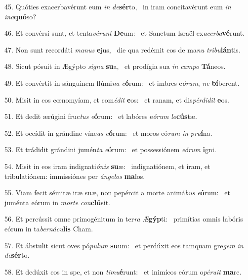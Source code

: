 45. Quóties exacerbavérunt eum \textit{in} \textit{de}\textbf{sér}to, \ast\  in iram concitavérunt eum \textit{in} \textit{in}\textit{a}\textbf{quó}so?\

46. Et convérsi sunt, et tenta\textit{vé}\textit{runt} \textbf{De}um: \ast\  et Sanctum Israël ex\textit{a}\textit{cer}\textit{ba}\textbf{vé}runt.\

47. Non sunt recordáti \textit{ma}\textit{nus} \textbf{e}jus, \ast\  die qua redémit eos de ma\textit{nu} \textit{tri}\textit{bu}\textbf{lán}tis.\

48. Sicut pósuit in Ægýpto \textit{si}\textit{gna} \textbf{su}a, \ast\  et prodígia sua \textit{in} \textit{cam}\textit{po} \textbf{Tá}neos.\

49. Et convértit in sánguinem flúmi\textit{na} \textit{e}\textbf{ó}rum: \ast\  et imbres e\textit{ó}\textit{rum}, \textit{ne} \textbf{bí}berent.\

50. Misit in eos cœnomyíam, et com\textit{é}\textit{dit} \textbf{e}os: \ast\  et ranam, et dis\textit{pér}\textit{di}\textit{dit} \textbf{e}os.\

51. Et dedit ærúgini fruc\textit{tus} \textit{e}\textbf{ó}rum: \ast\  et labóres e\textit{ó}\textit{rum} \textit{lo}\textbf{cús}tæ.\

52. Et occídit in grándine víne\textit{as} \textit{e}\textbf{ó}rum: \ast\  et moros eó\textit{rum} \textit{in} \textit{pru}\textbf{í}na.\

53. Et trádidit grándini jumén\textit{ta} \textit{e}\textbf{ó}rum: \ast\  et possessiónem \textit{e}\textit{ó}\textit{rum} \textbf{i}gni.\

54. Misit in eos iram indignati\textit{ó}\textit{nis} \textbf{su}æ: \ast\  indignatiónem, et iram, et tribulatiónem: immissiónes per \textit{án}\textit{ge}\textit{los} \textbf{ma}los.\

55. Viam fecit sémitæ iræ suæ, non pepércit a morte animá\textit{bus} \textit{e}\textbf{ó}rum: \ast\  et juménta eórum in \textit{mor}\textit{te} \textit{con}\textbf{clú}sit.\

56. Et percússit omne primogénitum in ter\textit{ra} \textit{Æ}\textbf{gýp}ti: \ast\  primítias omnis labóris eórum in ta\textit{ber}\textit{ná}\textit{cu}\textbf{lis} Cham.\

57. Et ábstulit sicut oves pó\textit{pu}\textit{lum} \textbf{su}um: \ast\  et perdúxit eos tamquam gre\textit{gem} \textit{in} \textit{de}\textbf{sér}to.\

58. Et dedúxit eos in spe, et non \textit{ti}\textit{mu}\textbf{é}runt: \ast\  et inimícos eórum o\textit{pé}\textit{ru}\textit{it} \textbf{ma}re.\

